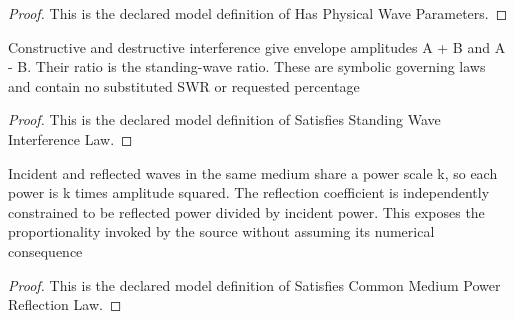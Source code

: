 \begin{proof}
  This is the declared model definition of Has Physical Wave Parameters.
\end{proof}
\begin{definition}
  \label{def:physics:phyx-mini-0307:phyxminiproblems-problemphyxmini0307-satisfiesstandingwaveinterferencelaw}
  Constructive and destructive interference give envelope amplitudes A + B and A - B. Their ratio is the standing-wave ratio. These are symbolic governing laws and contain no substituted SWR or requested percentage
\end{definition}
\begin{proof}
  This is the declared model definition of Satisfies Standing Wave Interference Law.
\end{proof}
\begin{definition}
  \label{def:physics:phyx-mini-0307:phyxminiproblems-problemphyxmini0307-satisfiescommonmediumpowerreflectionlaw}
  Incident and reflected waves in the same medium share a power scale k, so each power is k times amplitude squared. The reflection coefficient is independently constrained to be reflected power divided by incident power. This exposes the proportionality invoked by the source without assuming its numerical consequence
\end{definition}
\begin{proof}
  This is the declared model definition of Satisfies Common Medium Power Reflection Law.
\end{proof}
